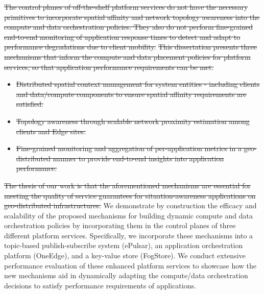\begin{summary}
\sout{The control planes of off-the-shelf platform services do not have the necessary primitives to incorporate spatial affinity and network topology awareness into the compute and data orchestration policies. They also do not perform fine-grained end-to-end monitoring of application response times to detect and adapt to performance degradations due to client mobility.} \sout{This dissertation presents three mechanisms that inform the compute and data placement policies for platform services, so that application performance requirements can be met.}
\begin{itemize}
\item {}\sout{Distributed spatial context management for system entities - including clients and data/compute components to ensure spatial affinity requirements are satisfied.}
\item {}\sout{Topology awareness through scalable network proximity estimation among clients and Edge sites.}
\item {} \sout{Fine-grained monitoring and aggregation of per-application metrics in a geo-distributed manner to provide end-to-end insights into application performance.}
\end{itemize}
\sout{The thesis of our work is that the aforementioned mechanisms are essential for meeting the quality of service guarantees for situation-awareness applications on geo-distributed infrastructures.} We demonstrate by construction the efficacy and scalability of the proposed mechanisms for building dynamic compute and data orchestration policies by incorporating them in the control planes of three different platform services. Specifically, we incorporate these mechanisms into a topic-based publish-subscribe system (ePulsar), an application orchestration platform (OneEdge), and a key-value store (FogStore). We conduct extensive performance evaluation of these enhanced platform services to showcase how the new mechanisms aid in dynamically adapting the compute/data orchestration decisions to satisfy performance requirements of applications.
\end{summary}